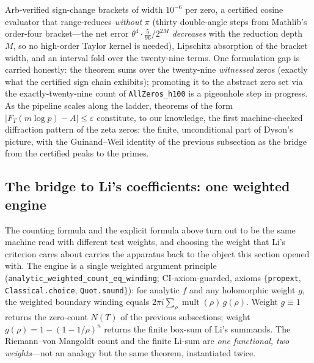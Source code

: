 Arb-verified sign-change brackets of width $10^{-6}$ per zero, a certified
cosine evaluator that range-reduces \emph{without} $\pi$ (thirty double-angle
steps from Mathlib's order-four bracket---the net error
$\theta^4\cdot\tfrac{5}{96}/2^{2M}$ \emph{decreases} with the reduction depth
$M$, so no high-order Taylor kernel is needed), Lipschitz absorption of the
bracket width, and an interval fold over the twenty-nine terms. One
formulation gap is carried honestly: the theorem sums over the twenty-nine
\emph{witnessed} zeros (exactly what the certified sign chain exhibits);
promoting it to the abstract zero set via the exactly-twenty-nine count of
\texttt{AllZeros\_h100} is a pigeonhole step in progress. As the pipeline
scales along the ladder, theorems of the form
$|F_T(m\log p) - A| \le \varepsilon$ constitute, to our knowledge, the
first machine-checked diffraction pattern of the zeta zeros: the finite,
unconditional part of Dyson's picture, with the Guinand--Weil identity of the
previous subsection as the bridge from the certified peaks to the primes.

\subsection{The bridge to Li's coefficients: one weighted engine}
\label{sub:bridge}

The counting formula and the explicit formula above turn out to be the same
machine read with different test weights, and choosing the weight that Li's
criterion cares about carries the apparatus back to the object this section
opened with. The engine is a single weighted argument principle
(\texttt{analytic\_weighted\_count\_eq\_winding}; CI-axiom-guarded, axioms
$\{$\texttt{propext}, \texttt{Classical.choice}, \texttt{Quot.sound}$\}$): for
analytic $f$ and any holomorphic weight $g$, the weighted boundary winding
equals $2\pi i \sum_{\rho} \operatorname{mult}(\rho)\, g(\rho)$. Weight
$g \equiv 1$ returns the zero-count $N(T)$ of the previous subsections; weight
$g(\rho) = 1 - (1 - 1/\rho)^n$ returns the finite box-sum of Li's summands. The
Riemann--von Mangoldt count and the finite Li-sum are \emph{one functional, two
weights}---not an analogy but the same theorem, instantiated twice.

